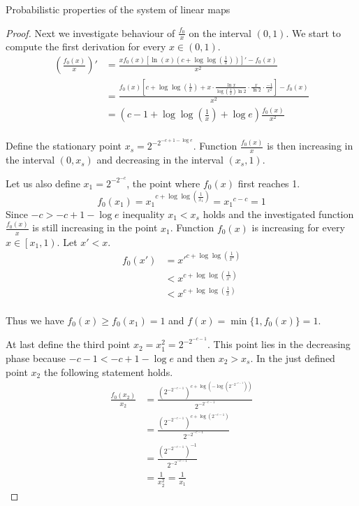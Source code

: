\begin{section}{Probabilistic properties of the system of linear maps}
\begin{proof}
Next we investigate behaviour of $\frac{f_0}{x}$ on the interval $(0, 1)$. We start to compute the first derivation for every $x \in (0, 1)$.
\[
\begin{split}
\left(\frac{f_0(x)}{x}\right)' 
	& = \frac{xf_0(x)\left[\ln(x)\left(c + \log \log \left(\frac{1}{x}\right)\right)\right]' - f_0(x)}{x^2} \\
	& = \frac{f_0(x)\left[c + \log \log \left(\frac{1}{x}\right) + x \cdot \frac{\ln x}{\log\left(\frac{1}{x}\right) \ln 2}\cdot\frac{x}{\ln 2}\cdot\frac{-1}{x ^ 2} \right] - f_0(x)}{x^2} \\
	& = \left(c - 1 + \log \log \left( \frac{1}{x} \right) + \log e \right)\frac{f_0(x)}{x^2} \\
\end{split}
\]

Define the stationary point $x_s = 2 ^ {-2 ^ {-c + 1 - \log e}}$. Function $\frac{f_0(x)}{x}$ is then increasing in the interval $(0, x_s)$ and decreasing in the interval $(x_s, 1)$. 

Let us also define $x_1 = 2 ^ {-2 ^ {-c}}$, the point where $f_0(x)$ first reaches 1.
\[
f_0(x_1) = {x_1} ^ {c + \log \log \left(\frac{1}{x_1}\right)} = {x_1} ^ {c - c} = 1
\]
Since $-c > -c + 1 -\log e$ inequality $x_1 < x_s$ holds and the investigated function $\frac{f_0(x)}{x}$ is still increasing in the point $x_1$.
Function $f_0(x)$ is increasing for every $x \in \left[x_1, 1\right)$. Let $x' < x$.
\[
\begin{split}
f_0(x') 
	& = {x'} ^ {c + \log \log \left(\frac{1}{x'}\right)} \\
	& < {x} ^ {c + \log \log \left(\frac{1}{x'}\right)} \\
	& < {x} ^ {c + \log \log \left(\frac{1}{x}\right)} \\
\end{split}
\]

Thus we have $f_0(x) \geq f_0(x_1) = 1$ and $f(x) = \min \{1, f_0(x)\} = 1$.

At last define the third point $x_2 = x_1 ^ 2 = 2 ^ {-2 ^ {-c - 1}}$. This point lies in the decreasing phase because $-c - 1 < -c + 1 - \log e$ and then $x_2 > x_s$. In the just defined point $x_2$ the following statement holds.
\[
\begin{split}
\frac{f_0(x_2)}{x_2} 
	& = \frac{\left(2 ^ {-2 ^ {-c - 1}}\right) ^ {c + \log \left(- \log \left(2 ^ {-2 ^ {-c - 1}}\right)\right)}}{2 ^ {-2 ^ {-c - 1}}} \\
	& = \frac{\left(2 ^ {-2 ^ {-c - 1}}\right) ^ {c + \log \left(2 ^ {-c - 1}\right)}}{2 ^ {-2 ^ {-c - 1}}} \\
	& = \frac{\left(2 ^ {-2 ^ {-c - 1}}\right) ^ {-1}}{2 ^ {-2 ^ {-c - 1}}} \\
	& = \frac{1}{x_2^2} = \frac{1}{x_1}
\end{split}
\]


\end{proof}
\end{section}
